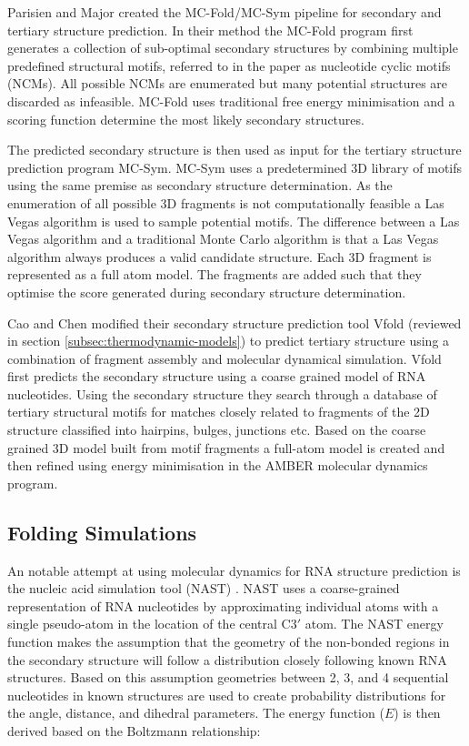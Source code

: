 \documentclass[journal]{IEEEtran}
\begin{document}
Parisien and Major\cite{parisien2008mc} created the MC-Fold/MC-Sym pipeline for secondary and tertiary structure prediction. In their method the MC-Fold program first generates a collection of sub-optimal secondary structures by combining multiple predefined structural motifs, referred to in the paper as nucleotide cyclic motifs (NCMs). All possible NCMs are enumerated but many potential structures are discarded as infeasible. MC-Fold uses traditional free energy minimisation and a scoring function determine the most likely secondary structures.

The predicted secondary structure is then used as input for the tertiary structure prediction program MC-Sym. MC-Sym uses a predetermined 3D library of motifs using the same premise as secondary structure determination. As the enumeration of all possible 3D fragments is not computationally feasible a Las Vegas algorithm is used to sample potential motifs. The difference between a Las Vegas algorithm and a traditional Monte Carlo algorithm is that a Las Vegas algorithm always produces a valid candidate structure. Each 3D fragment is represented as a full atom model. The fragments are added such that they optimise the score generated during secondary structure determination.

Cao and Chen \cite{cao2011physics} modified their secondary structure prediction tool Vfold \cite{cao2005predicting} (reviewed in section \ref{subsec:thermodynamic-models}) to predict tertiary structure using a combination of fragment assembly and molecular dynamical simulation. Vfold first predicts the secondary structure using a coarse grained model of RNA nucleotides. Using the secondary structure they search through a database of tertiary structural motifs for matches closely related to fragments of the 2D structure classified into hairpins, bulges, junctions etc. Based on the coarse grained 3D model built from motif fragments a full-atom model is created and then refined using energy minimisation in the AMBER \cite{case2010amber} molecular dynamics program. 

\subsection{Folding Simulations}
An notable attempt at using molecular dynamics for RNA structure prediction is the nucleic acid simulation tool (NAST) \cite{jonikas2009coarse}. NAST uses a coarse-grained representation of RNA nucleotides by approximating individual atoms with a single pseudo-atom in the location of the central C3$'$ atom. The NAST energy function makes the assumption that the geometry of the non-bonded regions in the secondary structure will follow a distribution closely following known RNA structures. Based on this assumption geometries between 2, 3, and 4 sequential nucleotides in known structures are used to create probability distributions for the angle, distance, and dihedral parameters. The energy function ($E$) is then derived based on the Boltzmann relationship:
\end{document}

